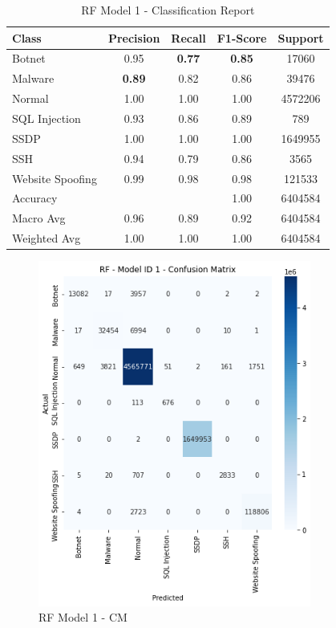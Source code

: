 \begin{table}[htbp]
  \centering
  \caption{RF Model 1 - Classification Report}
  \label{tab:rf_class_report}
    \begin{tabular}{lcccc}
    \toprule
    Class & Precision & Recall & F1-Score & Support \\
    \midrule
    Botnet & 0.95 & {\color{red}\bfseries 0.77} & {\color{red}\bfseries 0.85} & 17060 \\
    Malware & {\color{red}\bfseries 0.89} & 0.82 & 0.86 & 39476 \\
    Normal & 1.00 & 1.00 & 1.00 & 4572206 \\
    SQL Injection & 0.93 & 0.86 & 0.89 & 789 \\
    SSDP & 1.00 & 1.00 & 1.00 & 1649955 \\
    SSH & 0.94 & 0.79 & 0.86 & 3565 \\
    Website Spoofing & 0.99 & 0.98 & 0.98 & 121533 \\
    \midrule
    Accuracy & & & 1.00 & 6404584 \\
    Macro Avg & 0.96 & 0.89 & 0.92 & 6404584 \\
    Weighted Avg & 1.00 & 1.00 & 1.00 & 6404584 \\
    \bottomrule
    \end{tabular}
\end{table}

\begin{figure}[H]
    \centering
	\includegraphics[width=0.8\textwidth]{Appendices/Images/RF/Model1/RF_Model1_CM.png}
	\caption{RF Model 1 - CM}
  	\label{fig:rf_model1_cm}
\end{figure}

